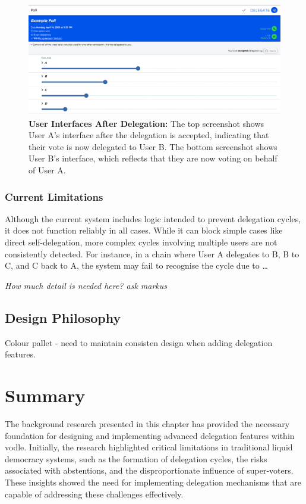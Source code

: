 \begin{enumerate}
\begin{figure} [H]
    \includegraphics[width=0.8\linewidth]{../common/initial_vodle_screenshots/userB_after.png}
    \caption{\textbf{User Interfaces After Delegation:} The top screenshot shows User A's interface after the delegation is accepted, indicating that their vote is now delegated to User B. The bottom screenshot shows User B's interface, which reflects that they are now voting on behalf of User A.}
    \label{fig:del_view_initial}
\end{figure}

\end{enumerate}

\subsubsection*{Current Limitations}

Although the current system includes logic intended to prevent delegation cycles, it does not function reliably in all cases. While it can block simple cases like direct self-delegation, more complex cycles involving multiple users are not consistently detected. For instance, in a chain where User A delegates to B, B to C, and C back to A, the system may fail to recognise the cycle due to \dots

\textit{How much detail is needed here? ask markus}
\subsection{Design Philosophy}
Colour pallet - need to maintain consisten design when adding delegation features.


\section{Summary}
The background research presented in this chapter has provided the necessary foundation for designing and implementing advanced delegation features within vodle. Initially, the research highlighted critical limitations in traditional liquid democracy systems, such as the formation of delegation cycles, the risks associated with abstentions, and the disproportionate influence of super-voters. These insights showed the need for implementing delegation mechanisms that are capable of addressing these challenges effectively.

